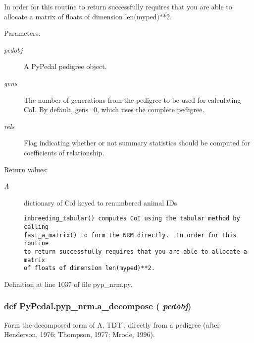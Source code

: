 In order for this routine to return successfully requires that you are able to allocate a matrix of floats of dimension len(myped)$\ast$$\ast$2. \begin{Desc}
\item[Parameters:]
\begin{description}
\item[{\em pedobj}]A Py\-Pedal pedigree object. \item[{\em gens}]The number of generations from the pedigree to be used for calculating Co\-I. By default, gens=0, which uses the complete pedigree. \item[{\em rels}]Flag indicating whether or not summary statistics should be computed for coefficients of relationship. \end{description}
\end{Desc}
\begin{Desc}
\item[Return values:]
\begin{description}
\item[{\em A}]dictionary of Co\-I keyed to renumbered animal IDs

\footnotesize\begin{verbatim}inbreeding_tabular() computes CoI using the tabular method by calling
fast_a_matrix() to form the NRM directly.  In order for this routine
to return successfully requires that you are able to allocate a matrix
of floats of dimension len(myped)**2.
\end{verbatim}
\normalsize
 \end{description}
\end{Desc}


Definition at line 1037 of file pyp\_\-nrm.py.\hypertarget{namespacePyPedal_1_1pyp__nrm_1f381e4601f9cbfec699bc2b293fc5eb}{
\subsubsection[a\_\-decompose]{\setlength{\rightskip}{0pt plus 5cm}def Py\-Pedal.pyp\_\-nrm.a\_\-decompose ( {\em pedobj})}}
\label{namespacePyPedal_1_1pyp__nrm_1f381e4601f9cbfec699bc2b293fc5eb}


Form the decomposed form of A, TDT', directly from a pedigree (after Henderson, 1976; Thompson, 1977; Mrode, 1996). 

